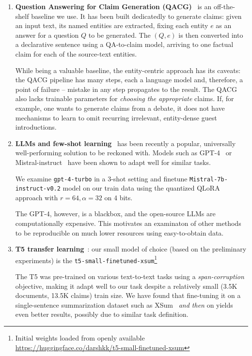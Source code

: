 \begin{enumerate}
    \item \textbf{Question Answering for Claim Generation (QACG)}~\cite{pan-etal-2021-zero} is an off-the-shelf baseline we use.
    It has been built dedicatedly to generate claims: given an input text, its named entities are extracted, fixing each entity $e$ as an answer for a question $Q$ to be generated.
    The $(Q,e)$ is then converted into a declarative sentence using a QA-to-claim model, arriving to one factual claim for each of the source-text entities.

    While being a valuable baseline, the entity-centric approach has its caveats: the QACG pipeline has many steps, each a language model and, therefore, a point of failure -- mistake in any step propagates to the result.
    The QACG also lacks trainable parameters for \textit{choosing the appropriate} claims.
    If, for example, one wants to generate claims from a debate, it does not have mechanisms to learn to omit recurring irrelevant, entity-dense guest introductions. 
    \item \textbf{LLMs and few-shot learning}~\cite{NEURIPS2020_1457c0d6} has been recently a popular, universally well-performing solution to be reckoned with.
    Models such as GPT-4~\cite{openai2023gpt4} or Mistral-instruct~\cite{jiang2023mistral} have been shown to adapt well for similar tasks.

    We examine \texttt{gpt-4-turbo} in a 3-shot setting and finetune \texttt{Mistral-7b-instruct-v0.2} model on our \ds{} train data using the quantized QLoRA~\cite{dettmers2023qlora} approach with $r=64, \alpha=32$ on 4 bits.

    The GPT-4, however, is a blackbox, and the open-source LLMs are computationally expensive.
    This motivates an examinaton of other methods to be reproducible on much lower resources using easy-to-obtain data.
    \item \textbf{T5 transfer learning}~\cite{2020t5}: our small model of choice (based on the preliminary experiments) is the \texttt{t5-small-finetuned-xsum}\footnote{Initial weights loaded from openly available \url{https://huggingface.co/darshkk/t5-small-finetuned-xsum}}
    
    The T5 was pre-trained on various text-to-text tasks using a \textit{span-corruption} objective, making it adapt well to our task despite a relatively small (3.5K \ds{} documents, 13.5K claims) train size.
    We have found that fine-tuning it on a single-sentence summarization dataset such as XSum~\cite{narayan-etal-2018-dont} \textit{and then} on \ds{} yields even better results, possibly due to similar task definition.


\end{enumerate}

